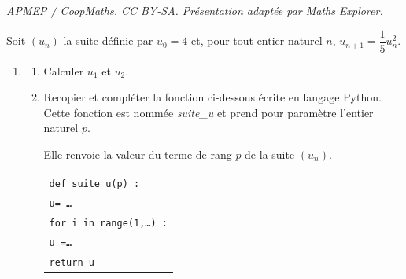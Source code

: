 \documentclass[10pt]{article}
\begin{document}
\noindent\textit{APMEP / CoopMaths. CC BY-SA. Présentation adaptée par Maths Explorer.}\par\medskip
\medskip

Soit $\left(u_n\right)$ la suite définie par $u_0 = 4$ et, pour tout entier naturel $n$,\: $u_{n+1} = \dfrac15 u_n^2$.

\medskip

\begin{enumerate}
\item 
	\begin{enumerate}
		\item Calculer $u_1$ et $u_2$.
		\item Recopier et compléter la fonction ci-dessous écrite en langage Python.
Cette fonction est nommée \emph{suite\_u} et prend pour paramètre l'entier naturel $p$.

Elle renvoie la valeur du terme de rang $p$ de la suite $\left(u_n\right)$.

\begin{center}
\begin{tabular}{l}
\texttt{def suite\_u(p) :}\\
	\quad \texttt{u= \ldots}\\
	\quad \texttt{for i in range(1,\ldots) :}\\
	\quad \quad \texttt{u =\ldots}\\
	\quad \texttt{return u}\\
	\end{tabular}
\end{center}


\end{enumerate}
\end{enumerate}
\end{document}
